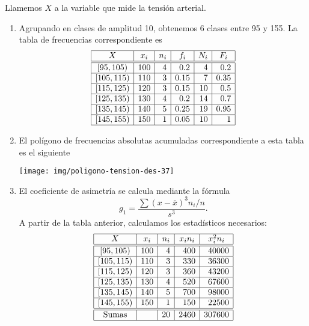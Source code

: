 {Llamemos $X$ a la variable que mide la tensión arterial.
\begin{enumerate}
\item Agrupando en clases de amplitud 10, obtenemos 6 clases entre 95 y 155. La tabla de frecuencias correspondiente es
\[
\begin{array}{|c|r|r|r|r|r|}
\hline
   X  & \multicolumn{1}{c|}{x_i} & \multicolumn{1}{c|}{n_i} & \multicolumn{1}{c|}{f_i} & \multicolumn{1}{c|}{N_i} & \multicolumn{1}{c|}{F_i}\\
\hline\hline
  [95,105)  &  100  &   4       & 0.2 & 4 & 0.2\\
\hline
 [105,115)  &  110 &    3       & 0.15 & 7 & 0.35 \\
\hline
 [115,125) &  120 &    3       & 0.15 &  10 & 0.5\\
\hline
 [125,135) &  130 &    4       & 0.2 & 14 & 0.7\\
\hline
 [135,145) &  140 &    5       & 0.25 & 19 & 0.95\\
\hline
 [145,155) &  150 &     1       & 0.05 & 10 & 1\\
\hline
\end{array}
\]

\item El polígono de frecuencias absolutas acumuladas correspondiente a esta tabla es el siguiente
\begin{center}
\texttt{[image: img/poligono-tension-des-37]}
\end{center}

\item El coeficiente de asimetría se calcula mediante la fórmula
\[g_1=\frac{\sum (x-\bar{x})^3n_i/n}{s^3}.\]
A partir de la tabla anterior, calculamos los estadísticos necesarios:
\[
\begin{array}{|c|r|r|r|r|}
\hline
   X  & \multicolumn{1}{c|}{x_i} & \multicolumn{1}{c|}{n_i} & \multicolumn{1}{c|}{x_in_i} & \multicolumn{1}{c|}{x_i^2n_i}\\
\hline\hline
  [95,105)  &  100  &   4       & 400 & 40000\\
\hline
 [105,115)  &  110 &    3       & 330 & 36300 \\
\hline
 [115,125) &  120 &    3       & 360 &  43200\\
\hline
 [125,135) &  130 &    4       & 520 & 67600 \\
\hline
 [135,145) &  140 &    5       & 700 & 98000 \\
\hline
 [145,155) &  150 &     1       & 150 & 22500\\
\hline
\hline
\textrm{Sumas} & & 20 & 2460 & 307600\\
\hline
\end{array}
\]


\end{enumerate}}
